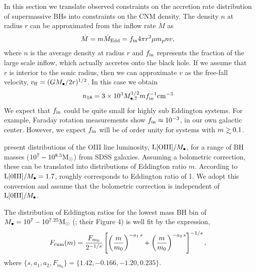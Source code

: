 \documentclass[usenatbib,fleqn]{mnras}
\newcommand\gsim{\mathrel{\rlap{\lower4pt\hbox{\hskip1pt$\sim$}}
    \raise1pt\hbox{$>$}}}
\newcommand{\Mbh}[1][]{M_{\bullet#1}}
\newcommand{\Msun}{{\rm M_\odot}}
\begin{document}
In this section we translate observed constraints on the accretion
rate distribution of supermassive BHs into constraints on the CNM
density.  The density $n$ at radius $r$ can be approximated from the
inflow rate $\dot{M}$ as
\begin{equation}
\dot{M} = m \dot{M}_{\rm Edd}= f_{\rm in} 4 \pi r^2 \mu m_p n v,
\label{eq:mdot}
\end{equation}
where $n$ is the average density at radius $r$ and $f_{\rm in}$
represents the fraction of the large scale inflow, which actually
accretes onto the black hole.  If we assume that $r$ is interior to
the sonic radius, then we can approximate $v$ as the free-fall
velocity, $v_{\rm ff} = (GM_{\bullet}/2r)^{1/2}$.  In this case we
obtain
\begin{equation}
n_{18} = 3 \times 10^3 M_{\bullet,7}^{1/2} m f_{\rm in}^{-1} {\rm
  cm}^{-3}
\label{eq:n18Edd}
\end{equation}
We expect that $f_{\rm in}$ could be quite small for highly sub
Eddington systems. For example, Faraday rotation measurements
\citep{Quataert+2000} show $f_{\rm in}\approx 10^{-3}$, in our own
galactic center. However, we expect $f_{\rm in}$ will be of order
unity for systems with $m\gsim 0.1$.  

\citet{Kauffmann+2009} present distributions of the OIII line
luminosity, ${\rm L[OIII]}/\Mbh$, for a range of BH masses
($10^7-10^{8.5} \Msun$) from SDSS galaxies.  Assuming a bolometric
correction, these can be translated into distributions of Eddington
ratio $m$.  According to \citet{Kauffmann+2009} ${\rm
  L[0III]}/\Mbh=1.7$, roughly corresponds to Eddington ratio of 1. We
adopt this conversion and assume that the bolometric correction is
independent of ${\rm L[0III]}/\Mbh$. 

The distribution of Eddington ratios for the lowest mass BH bin of
$M_{\bullet} = 10^7 - 10^{7.25} \Msun$ (\citealt{Kauffmann+2009};
their Figure 4) is well fit by the expression,
\begin{align}
  F_{\rm cum}(m)=\frac{F_{m_0}}{2^{-1/s}}
  \left[\left(\frac{m}{m_0}\right)^{-a_1\,
      s}+\left(\frac{m}{m_0}\right)^{-a_2 \, s}\right]^{-1/s} \label{eq:khFit},
\end{align}
where $\{s, a_1, a_2, F_{m_0}\} =\{1.42, -0.166, -1.20, 0.235\}$.
\end{document}
